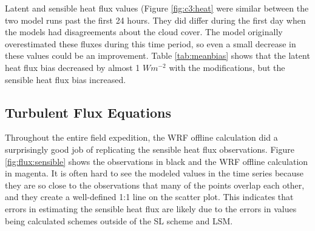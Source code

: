 Latent and sensible heat flux values (Figure \ref{fig:c3:heat} were similar between the two model runs past the first 24 hours. They did differ during the first day when the models had disagreements about the cloud cover. The model originally overestimated these fluxes during this time period, so even a small decrease in these values could be an improvement. Table \ref{tab:meanbias} shows that the latent heat flux bias decreased by almost 1 $Wm^{-2}$ with the modifications, but the sensible heat flux bias increased. 

\subsection{Turbulent Flux Equations}
Throughout the entire field expedition, the WRF offline calculation did a surprisingly good job of replicating the sensible heat flux observations. Figure \ref{fig:flux:sensible} shows the observations in black and the WRF offline calculation in magenta. It is often hard to see the modeled values in the time series because they are so close to the observations that many of the points overlap each other, and they create a well-defined 1:1 line on the scatter plot. This indicates that errors in estimating the sensible heat flux are likely due to the errors in values being calculated schemes outside of the SL scheme and LSM. 

